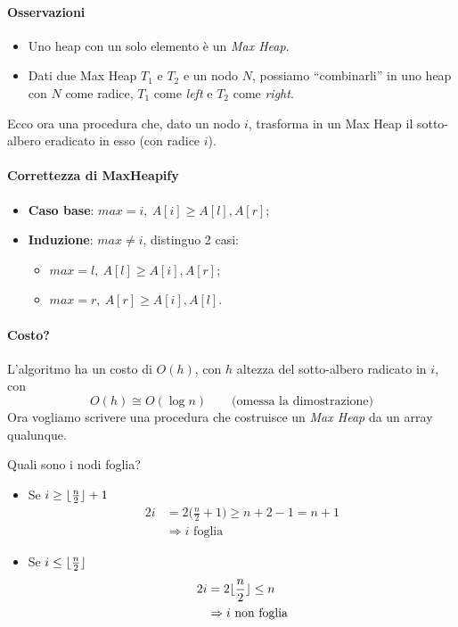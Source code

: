 \paragraph{Osservazioni}
\begin{itemize}[label=$\bullet$]
	\item Uno heap con un solo elemento è un \emph{Max Heap}.
	\item Dati due Max Heap $T_1$ e $T_2$ e un nodo $N$, possiamo ``combinarli'' in uno heap con
	$N$ come radice, $T_1$ come \emph{left} e $T_2$ come \emph{right}.
\end{itemize}

Ecco ora una procedura che, dato un nodo $i$, trasforma in un Max Heap il sotto-albero eradicato in esso (con radice $i$).



\paragraph{Correttezza di MaxHeapify} 
\begin{itemize}
	\item \textbf{Caso base}: $max = i, \ A[i] \geq A[l], A[r]$;
	\item \textbf{Induzione}: $max \neq i$, distinguo 2 casi:
	\begin{itemize}
		\item $max = l, \ A[l] \geq A[i], A[r]$;
		\item $max = r, \ A[r] \geq A[i], A[l]$.
	\end{itemize}
\end{itemize}
\paragraph{Costo?} L'algoritmo ha un costo di $O(h)$, con $h$ altezza del sotto-albero radicato in $i$, con 
$$O(h) \cong O(\log n) \qquad \text{(omessa la dimostrazione)}$$
Ora vogliamo scrivere una procedura che costruisce un \emph{Max Heap} da un array qualunque. \par
Quali sono i nodi foglia?
\begin{itemize}
	\item Se $i \geq \lfloor\frac{n}{2}\rfloor + 1$
	\begin{align*}
		2i & = 2\Big( \frac{n}{2} + 1 \Big) \geq n + 2 - 1 = n + 1 \\
		& \Rightarrow i \text{ foglia}
	\end{align*}
	\item Se $i \leq \lfloor\frac{n}{2}\rfloor$
	\begin{align*}
		2i & = 2 \lfloor\frac{n}{2}\rfloor \leq n \\
		& \Rightarrow i \text{ non foglia}
	\end{align*}
\end{itemize}

